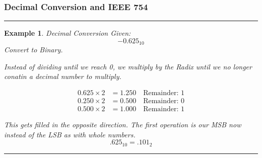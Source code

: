\documentclass[12pt]{article}
\newtheorem{example}{Example}
\newenvironment{examp}
{
    \vspace{0.5cm}
    \hrule
    \begin{example}\upshape
}
{
    \end{example}
    \hrule
    \vspace{0.5cm}
}
\begin{document}
\subsubsection{Decimal Conversion and IEEE 754}
\begin{examp}
	Decimal Conversion \newline
	Given:
	\[
		-0.625_{10}
	\]
	Convert to Binary.

	Instead of dividing until we reach 0, we multiply by the
	Radix until we no longer conatin a decimal number to
	multiply.

	\begin{align*}
		0.625 \times 2 & = 1.250 \quad \text{Remainder: 1} \\
		0.250 \times 2 & = 0.500 \quad \text{Remainder: 0} \\
		0.500 \times 2 & = 1.000 \quad \text{Remainder: 1}
	\end{align*}

	This gets filled in the opposite direction. The first
	operation is our MSB now instead of the LSB as with whole
	numbers.
	\[
		.625_{10} = .101_2
	\]
\end{examp}
\end{document}
